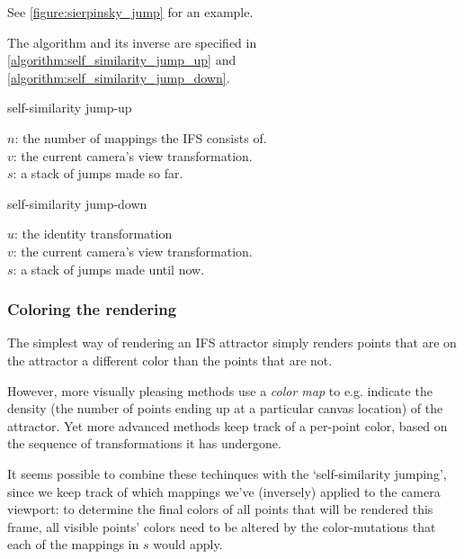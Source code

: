 \documentclass[11pt]{article}
\begin{document}
See \autoref{figure:sierpinsky_jump} for an example. 

The algorithm and its inverse are specified in \autoref{algorithm:self_similarity_jump_up} and \autoref{algorithm:self_similarity_jump_down}.

\begin{algorithm}
\caption{self-similarity jump-up}
\label{algorithm:self_similarity_jump_up}
  $n$: the number of mappings the IFS consists of. \\
  $v$: the current camera's view transformation. \\
  $s$: a stack of jumps made so far. \\
\end{algorithm}

\begin{algorithm}
\caption{self-similarity jump-down}
\label{algorithm:self_similarity_jump_down}
  $u$: the identity transformation \\
  $v$: the current camera's view transformation. \\
  $s$: a stack of jumps made until now. \\
\end{algorithm}

\subsubsection{Coloring the rendering}
\label{sec:org9844bd2}
\label{subsection:coloring}

The simplest way of rendering an IFS attractor simply renders points that are on the attractor a different color
than the points that are not.

However, more visually pleasing methods use a \emph{color map} to e.g. indicate the density (the number of points ending up at a particular canvas location) of the attractor.
Yet more advanced methods \cite{draves2003fractal} keep track of a per-point color, based on the sequence of transformations it has undergone.

It seems possible to combine these techinques with the `self-similarity jumping', since we keep track of which mappings we've (inversely) applied to the camera viewport:
to determine the final colors of all points that will be rendered this frame, 
all visible points' colors need to be altered by the color-mutations that each of the mappings in \(s\) would apply.
\end{document}
